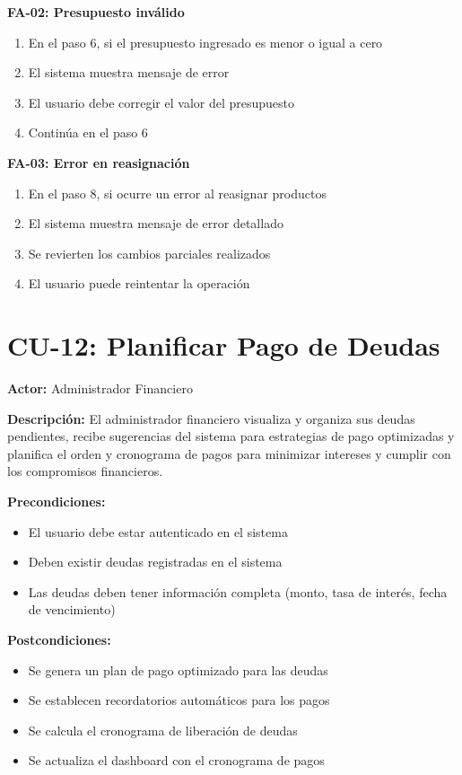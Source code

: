 \textbf{FA-02: Presupuesto inválido}
\begin{enumerate}
    \item En el paso 6, si el presupuesto ingresado es menor o igual a cero
    \item El sistema muestra mensaje de error
    \item El usuario debe corregir el valor del presupuesto
    \item Continúa en el paso 6
\end{enumerate}

\textbf{FA-03: Error en reasignación}
\begin{enumerate}
    \item En el paso 8, si ocurre un error al reasignar productos
    \item El sistema muestra mensaje de error detallado
    \item Se revierten los cambios parciales realizados
    \item El usuario puede reintentar la operación
\end{enumerate}

\section{CU-12: Planificar Pago de Deudas}

\noindent\textbf{Actor:} Administrador Financiero

\noindent\textbf{Descripción:} El administrador financiero visualiza y organiza sus deudas pendientes, recibe sugerencias del sistema para estrategias de pago optimizadas y planifica el orden y cronograma de pagos para minimizar intereses y cumplir con los compromisos financieros.

\noindent\textbf{Precondiciones:}
\begin{itemize}
    \item El usuario debe estar autenticado en el sistema
    \item Deben existir deudas registradas en el sistema
    \item Las deudas deben tener información completa (monto, tasa de interés, fecha de vencimiento)
\end{itemize}

\noindent\textbf{Postcondiciones:}
\begin{itemize}
    \item Se genera un plan de pago optimizado para las deudas
    \item Se establecen recordatorios automáticos para los pagos
    \item Se calcula el cronograma de liberación de deudas
    \item Se actualiza el dashboard con el cronograma de pagos
\end{itemize}

